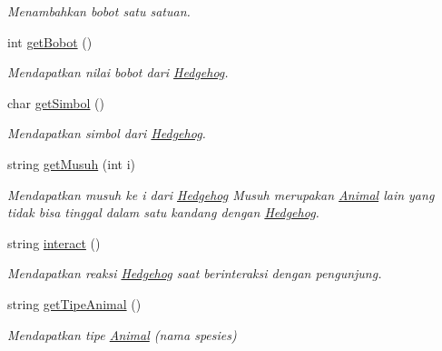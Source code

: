 \begin{DoxyCompactItemize}
\begin{DoxyCompactList}\small\item\em Menambahkan bobot satu satuan. \end{DoxyCompactList}\item 
int \hyperlink{classHedgehog_a4756f496e554eb53fe9fe42af5d4c359}{get\-Bobot} ()
\begin{DoxyCompactList}\small\item\em Mendapatkan nilai bobot dari \hyperlink{classHedgehog}{Hedgehog}. \end{DoxyCompactList}\item 
char \hyperlink{classHedgehog_aa6dd18c288110a508502abb7c180fd7c}{get\-Simbol} ()
\begin{DoxyCompactList}\small\item\em Mendapatkan simbol dari \hyperlink{classHedgehog}{Hedgehog}. \end{DoxyCompactList}\item 
string \hyperlink{classHedgehog_a36e1421838e26fc245649161b2dc97d3}{get\-Musuh} (int i)
\begin{DoxyCompactList}\small\item\em Mendapatkan musuh ke i dari \hyperlink{classHedgehog}{Hedgehog} Musuh merupakan \hyperlink{classAnimal}{Animal} lain yang tidak bisa tinggal dalam satu kandang dengan \hyperlink{classHedgehog}{Hedgehog}. \end{DoxyCompactList}\item 
string \hyperlink{classHedgehog_aa3d9dacd74c2150b6254b8edff36fb3a}{interact} ()
\begin{DoxyCompactList}\small\item\em Mendapatkan reaksi \hyperlink{classHedgehog}{Hedgehog} saat berinteraksi dengan pengunjung. \end{DoxyCompactList}\item 
string \hyperlink{classHedgehog_a1b17920e9c635183e72264f234f1485a}{get\-Tipe\-Animal} ()
\begin{DoxyCompactList}\small\item\em Mendapatkan tipe \hyperlink{classAnimal}{Animal} (nama spesies) \end{DoxyCompactList}\end{DoxyCompactItemize}
